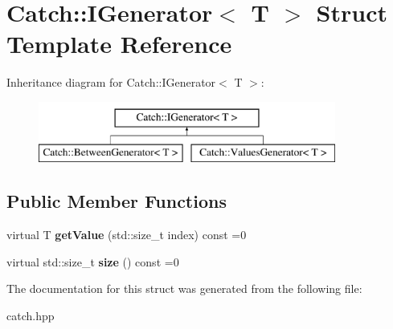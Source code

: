 \hypertarget{structCatch_1_1IGenerator}{}\section{Catch\+:\+:I\+Generator$<$ T $>$ Struct Template Reference}
\label{structCatch_1_1IGenerator}
Inheritance diagram for Catch\+:\+:I\+Generator$<$ T $>$\+:\begin{figure}[H]
\begin{center}
\leavevmode
\includegraphics[height=2.000000cm]{structCatch_1_1IGenerator}
\end{center}
\end{figure}
\subsection*{Public Member Functions}
\begin{DoxyCompactItemize}
\item 
\mbox{\label{structCatch_1_1IGenerator_ad69e937cb66dba3ed9429c42abf4fce3}} 
virtual T {\bfseries get\+Value} (std\+::size\+\_\+t index) const =0
\item 
\mbox{\label{structCatch_1_1IGenerator_a2e317253b03e838b6065ce69719a198e}} 
virtual std\+::size\+\_\+t {\bfseries size} () const =0
\end{DoxyCompactItemize}


The documentation for this struct was generated from the following file\+:\begin{DoxyCompactItemize}
\item 
catch.\+hpp\end{DoxyCompactItemize}
